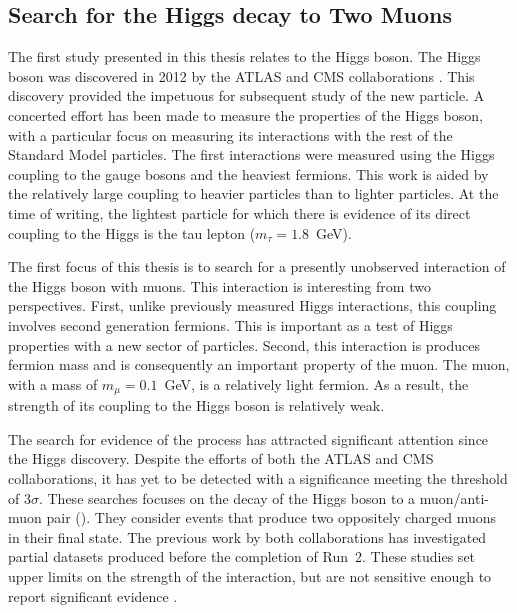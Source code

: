 \subsection{Search for the Higgs decay to Two Muons}
The first study presented in this thesis relates to the Higgs boson.
The Higgs boson was discovered in 2012 by the ATLAS and CMS collaborations \cite{atlashiggs,cmshiggs}.
This discovery provided the impetuous for subsequent study of the new particle.
A concerted effort has been made to measure the properties of the Higgs boson, with a particular focus on measuring its interactions with the rest of the Standard Model particles.
The first interactions were measured using the Higgs coupling to the gauge bosons and the heaviest fermions.
This work is aided by the relatively large coupling to heavier particles than to lighter particles.
At the time of writing, the lightest particle for which there is evidence of its direct coupling to the Higgs is the tau lepton ($m_\tau=1.8$~GeV).

The first focus of this thesis is to search for a presently unobserved interaction of the Higgs boson with muons.
This interaction is interesting from two perspectives.
First, unlike previously measured Higgs interactions, this coupling involves second generation fermions.
This is important as a test of Higgs properties with a new sector of particles.
Second, this interaction is produces fermion mass and is consequently an important property of the muon. 
The muon, with a mass of $m_\mu=0.1$~GeV, is a relatively light fermion. As a result, the strength of its coupling to the Higgs boson is relatively weak.

The search for evidence of the \hmm process has attracted significant attention since the Higgs discovery.
Despite the efforts of both the ATLAS and CMS collaborations, it has yet to be detected with a significance meeting the threshold of 3$\sigma$.
These searches focuses on the decay of the Higgs boson to a muon/anti-muon pair (\hmm).
They consider events that produce two oppositely charged muons in their final state.
The previous work by both collaborations has investigated partial datasets produced before the completion of Run~2.
These studies set upper limits on the strength of the interaction, but are not sensitive enough to report significant evidence \cite{atlasHmm36,cmsHmm35}.

